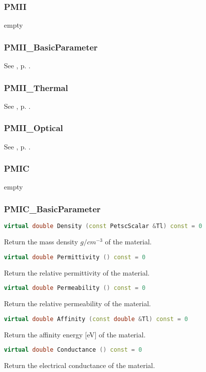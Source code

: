\documentclass[oneside,12pt]{cgd_book}
\begin{document}
\subsubsection{PMII}
empty
\par
\subsubsection{PMII\_BasicParameter}
See , p. \pageref{sec:Extend:PMI:Ref:PMIS:Basic}.
\par
\subsubsection{PMII\_Thermal}
See , p. \pageref{sec:Extend:PMI:Ref:PMIS:Thermal}.
\par
\subsubsection{PMII\_Optical}
See , p. \pageref{sec:Extend:PMI:Ref:PMIS:Optical}.
\par
\subsubsection{PMIC}
empty
\par
\subsubsection{PMIC\_BasicParameter}
\begin{lstlisting}[language={C++}]
virtual double Density (const PetscScalar &Tl) const = 0
\end{lstlisting}
Return the mass density $g/cm^{-3}$ of the material.
\par
\begin{lstlisting}[language={C++}]
virtual double Permittivity () const = 0
\end{lstlisting}
Return the relative permittivity of the material.
\par
\begin{lstlisting}[language={C++}]
virtual double Permeability () const = 0
\end{lstlisting}
Return the relative permeability of the material.
\par
\begin{lstlisting}[language={C++}]
virtual double Affinity (const double &Tl) const = 0
\end{lstlisting}
Return the affinity energy [eV] of the material.
\par
\begin{lstlisting}[language={C++}]
virtual double Conductance () const = 0
\end{lstlisting}
Return the electrical conductance of the material.
\par
\par
\end{document}
